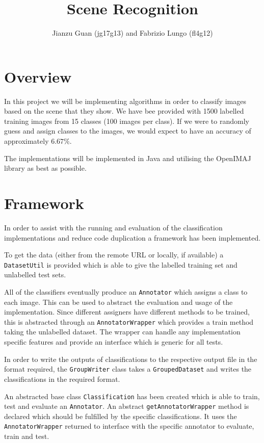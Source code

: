 \documentclass[paper=a4, fontsize=11pt]{article}
\begin{document}
\title{Scene Recognition}
\author{Jianzu Guan (jg17g13) and Fabrizio Lungo (fl4g12)}
\maketitle

\section{Overview}

In this project we will be implementing algorithms in order to classify images based on the scene that they show. We have bee provided with 1500 labelled training images from 15 classes (100 images per class). If we were to randomly guess and assign classes to the images, we would expect to have an accuracy of approximately $6.67\%$.

The implementations will be implemented in Java and utilising the OpenIMAJ library as best as possible.

\section{Framework}

In order to assist with the running and evaluation of the classification implementations and reduce code duplication a framework has been implemented.

To get the data (either from the remote URL or locally, if available) a \texttt{DatasetUtil} is provided which is able to give the labelled training set and unlabelled test sets.

All of the classifiers eventually produce an \texttt{Annotator} which assigns a class to each image. This can be used to abstract the evaluation and usage of the implementation. Since different assigners have different methods to be trained, this is abstracted through an \texttt{AnnotatorWrapper} which provides a train method taking the unlabelled dataset. The wrapper can handle any implementation specific features and provide an interface which is generic for all tests.

In order to write the outputs of classifications to the respective output file in the format required, the \texttt{GroupWriter} class takes a \texttt{GroupedDataset} and writes the classifications in the required format.

An abstracted base class \texttt{Classification} has been created which is able to train, test and evaluate an \texttt{Annotator}. An abstract \texttt{getAnnotatorWrapper} method is declared which should be fulfilled by the specific classifications. It uses the \texttt{AnnotatorWrapper} returned to interface with the specific annotator to evaluate, train and test.
\end{document}

